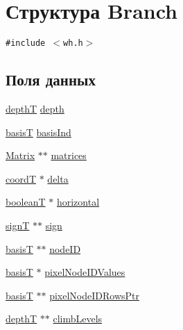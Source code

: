 \hypertarget{struct_branch}{
\section{Структура Branch}
\label{struct_branch}
}
{\tt \#include $<$wh.h$>$}

\subsection*{Поля данных}
\begin{CompactItemize}
\item 
\hyperlink{walsh__hadamard__run_2pm_2whimport_8h_22f5977248d0f2af892f3ac9af10b1a7}{depthT} \hyperlink{struct_branch_18e1d6a7e4e0ea1c47f009194b9b8ec1}{depth}
\item 
\hyperlink{walsh__hadamard__run_2pm_2whimport_8h_e75f61aaa63d0b7478b8fc8f4f8a15cb}{basisT} \hyperlink{struct_branch_4a485bc75f8beb1a6ec65ee2f5094b6c}{basisInd}
\item 
\hyperlink{struct_matrix}{Matrix} $\ast$$\ast$ \hyperlink{struct_branch_cc4d33e5fbaf7fff785ddfc7fab518e8}{matrices}
\item 
\hyperlink{walsh__hadamard__run_2pm_2whimport_8h_f75219364b309824eef21d65e9edc43d}{coordT} $\ast$ \hyperlink{struct_branch_b9ee20f7f190a7f72b4cfa38c3266c40}{delta}
\item 
\hyperlink{walsh__hadamard__run_2pm_2whimport_8h_696db3d7aea6d9d091f2ac73432b948b}{booleanT} $\ast$ \hyperlink{struct_branch_a3d658a618e1bdf88f5368537374a9e0}{horizontal}
\item 
\hyperlink{walsh__hadamard__run_2pm_2whimport_8h_14e3c9888ccc350e9e7af9cff09ebcc5}{signT} $\ast$$\ast$ \hyperlink{struct_branch_3603ab846d5e5fea006d5ec7427af1ef}{sign}
\item 
\hyperlink{walsh__hadamard__run_2pm_2whimport_8h_e75f61aaa63d0b7478b8fc8f4f8a15cb}{basisT} $\ast$$\ast$ \hyperlink{struct_branch_0839e32a3ff06919e32a3408a3f4cfaa}{nodeID}
\item 
\hyperlink{walsh__hadamard__run_2pm_2whimport_8h_e75f61aaa63d0b7478b8fc8f4f8a15cb}{basisT} $\ast$ \hyperlink{struct_branch_24aac183ab445e108aa8437acd9402b8}{pixelNodeIDValues}
\item 
\hyperlink{walsh__hadamard__run_2pm_2whimport_8h_e75f61aaa63d0b7478b8fc8f4f8a15cb}{basisT} $\ast$$\ast$ \hyperlink{struct_branch_00e58d523bde4e600765612208c90567}{pixelNodeIDRowsPtr}
\item 
\hyperlink{walsh__hadamard__run_2pm_2whimport_8h_22f5977248d0f2af892f3ac9af10b1a7}{depthT} $\ast$$\ast$ \hyperlink{struct_branch_5d1c06b200e9a85db3a776537e546ea6}{climbLevels}
\end{CompactItemize}


